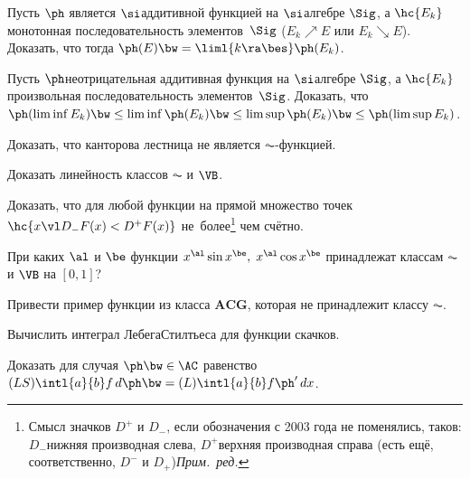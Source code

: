 \documentclass[a4paper]{article}
\begin{document}
\begin{problem}
  Пусть $\ph$ является $\si$\д аддитивной функцией на $\si$\д алгебре $\Sig$, а $\hc{E_k}$\т
  монотонная последовательность элементов~$\Sig$ ( $E_k \nearrow E$ или $E_k \searrow E$).
  Доказать, что тогда $\ph(E)  \bw= \liml{k \ra \bes} \ph(E_k)$.
\end{problem}

\begin{problem}
  Пусть $\ph$\т неотрицательная аддитивная функция на $\si$\д алгебре $\Sig$, а $\hc{E_k}$\т
  произвольная последовательность элементов~$\Sig$. Доказать, что
  $\ph(\liminf E_k) \bw\le \liminf \ph(E_k) \bw\le \limsup \ph(E_k) \bw\le \ph(\limsup E_k)$.
\end{problem}

\begin{problem}
  Доказать, что канторова лестница не является $\AC$-функцией.
\end{problem}

\begin{problem}
  Доказать линейность классов $\AC$ и $\VB$.
\end{problem}

\begin{problem}
  Доказать, что для любой функции на прямой множество точек $\hc{x\vl D_-F(x) < D^+F(x)}$
  не~более\footnote{Смысл значков $D^+$ и $D_-$, если обозначения с 2003 года не поменялись, таков: $D_-$\т нижняя производная
  слева, $D^+$\т верхняя производная справа (есть ещё, соответственно, $D^-$ и $D_+$)\т \emph{Прим.~ред.}} чем счётно.
\end{problem}

\begin{problem}
  При каких $\al$ и  $\be$ функции $x^\al\sin x^\be, \; x^\al \cos x^\be$ принадлежат
  классам $\AC$ и $\VB$ на $[0,1]$?
\end{problem}

\begin{problem}
  Привести пример функции из класса $\mathbf{ACG}$, которая не принадлежит классу $\AC$.
\end{problem}

\begin{problem}
  Вычислить интеграл Лебега\ч Стилтьеса для функции скачков.
\end{problem}

\begin{problem}
  Доказать для случая $\ph \bw\in \AC$ равенство $(LS)\intl{a}{b}f\,d\ph \bw= (L)\intl{a}{b}f\ph'\,dx$.
\end{problem}
\end{document}
